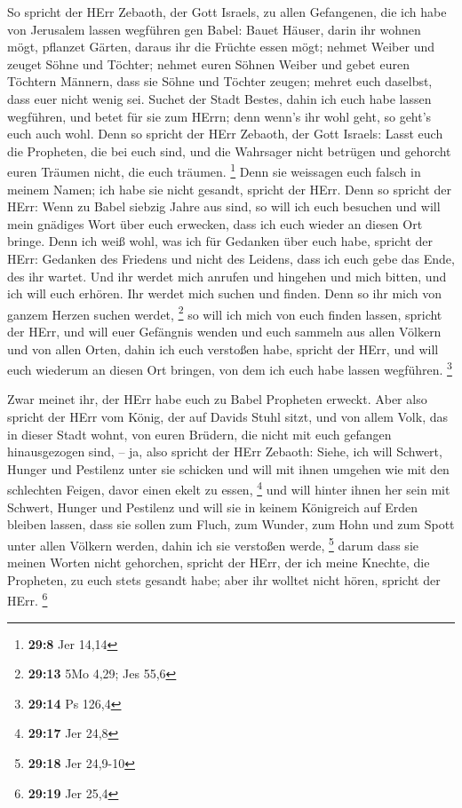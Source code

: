  So spricht der HErr Zebaoth, der Gott Israels, zu allen
Gefangenen, die ich habe von Jerusalem lassen wegführen gen Babel:
 Bauet Häuser, darin ihr wohnen mögt, pflanzet Gärten,
daraus ihr die Früchte essen mögt;  nehmet Weiber und zeuget
Söhne und Töchter; nehmet euren Söhnen Weiber und gebet euren Töchtern
Männern, dass sie Söhne und Töchter zeugen; mehret euch daselbst, dass
euer nicht wenig sei.  Suchet der Stadt Bestes, dahin ich
euch habe lassen wegführen, und betet für sie zum HErrn; denn wenn's ihr
wohl geht, so geht's euch auch wohl.  Denn so spricht der
HErr Zebaoth, der Gott Israels: Lasst euch die Propheten, die bei euch
sind, und die Wahrsager nicht betrügen und gehorcht euren Träumen nicht,
die euch träumen. \footnote{\textbf{29:8} Jer 14,14}  Denn
sie weissagen euch falsch in meinem Namen; ich habe sie nicht gesandt,
spricht der HErr.  Denn so spricht der HErr: Wenn zu Babel
siebzig Jahre aus sind, so will ich euch besuchen und will mein gnädiges
Wort über euch erwecken, dass ich euch wieder an diesen Ort bringe.
 Denn ich weiß wohl, was ich für Gedanken über euch habe,
spricht der HErr: Gedanken des Friedens und nicht des Leidens, dass ich
euch gebe das Ende, des ihr wartet.  Und ihr werdet mich
anrufen und hingehen und mich bitten, und ich will euch erhören.
 Ihr werdet mich suchen und finden. Denn so ihr mich von
ganzem Herzen suchen werdet, \footnote{\textbf{29:13} 5Mo 4,29; Jes 55,6}
 so will ich mich von euch finden lassen, spricht der HErr,
und will euer Gefängnis wenden und euch sammeln aus allen Völkern und
von allen Orten, dahin ich euch verstoßen habe, spricht der HErr, und
will euch wiederum an diesen Ort bringen, von dem ich euch habe lassen
wegführen. \footnote{\textbf{29:14} Ps 126,4}

 Zwar meinet ihr, der HErr habe euch zu Babel Propheten
erweckt.  Aber also spricht der HErr vom König, der auf
Davids Stuhl sitzt, und von allem Volk, das in dieser Stadt wohnt, von
euren Brüdern, die nicht mit euch gefangen hinausgezogen sind,
 -- ja, also spricht der HErr Zebaoth: Siehe, ich will
Schwert, Hunger und Pestilenz unter sie schicken und will mit ihnen
umgehen wie mit den schlechten Feigen, davor einen ekelt zu essen,
\footnote{\textbf{29:17} Jer 24,8}  und will hinter ihnen
her sein mit Schwert, Hunger und Pestilenz und will sie in keinem
Königreich auf Erden bleiben lassen, dass sie sollen zum Fluch, zum
Wunder, zum Hohn und zum Spott unter allen Völkern werden, dahin ich sie
verstoßen werde, \footnote{\textbf{29:18} Jer 24,9-10} 
darum dass sie meinen Worten nicht gehorchen, spricht der HErr, der ich
meine Knechte, die Propheten, zu euch stets gesandt habe; aber ihr
wolltet nicht hören, spricht der HErr. \footnote{\textbf{29:19} Jer 25,4}

